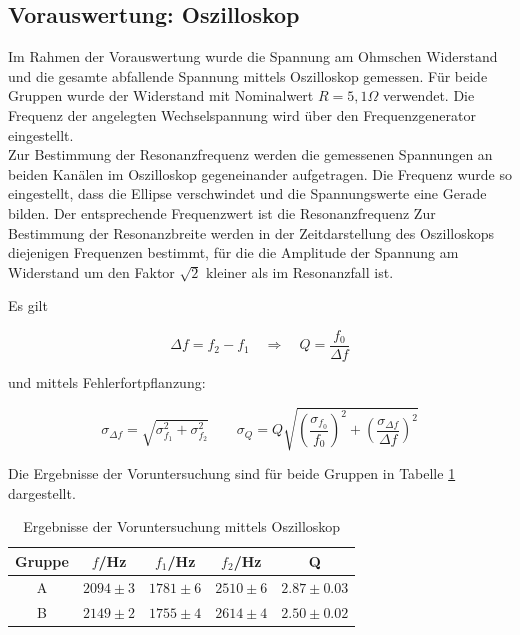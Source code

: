 \documentclass[12pt,a4paper]{article}
\begin{document}
\subsection{Vorauswertung: Oszilloskop}
Im Rahmen der Vorauswertung wurde die Spannung am Ohmschen Widerstand und die gesamte abfallende Spannung mittels Oszilloskop gemessen. Für beide Gruppen wurde der Widerstand mit Nominalwert $R = 5,1 \Omega$ verwendet. Die Frequenz der angelegten Wechselspannung wird über den Frequenzgenerator eingestellt.\\

Zur Bestimmung der Resonanzfrequenz werden die gemessenen Spannungen an beiden Kanälen im Oszilloskop gegeneinander aufgetragen. Die Frequenz wurde so eingestellt, dass die Ellipse verschwindet und die Spannungswerte eine Gerade bilden. Der entsprechende Frequenzwert ist die Resonanzfrequenz
Zur Bestimmung der Resonanzbreite werden in der Zeitdarstellung des Oszilloskops diejenigen Frequenzen bestimmt, für die die Amplitude der Spannung am Widerstand um den Faktor $\sqrt{2}$ kleiner als im Resonanzfall ist. 

Es gilt

\begin{equation}
\Delta f = f_2 - f_1 \quad \Rightarrow \quad Q = \frac{f_0}{\Delta f}
\end{equation}

und mittels Fehlerfortpflanzung:

\begin{equation}
\sigma_{\Delta f} = \sqrt{\sigma_{f_1}^2+\sigma_{f_2}^2} \qquad \sigma_Q = Q \sqrt{\left(\frac{\sigma_{f_0}}{f_0}\right)^2 + \left(\frac{\sigma_{\Delta f}}{\Delta f}\right)^2}
\end{equation}

Die Ergebnisse der Voruntersuchung sind für beide Gruppen in Tabelle \ref{tab:Voruntersuchung} dargestellt.

\begin{table}
\centering
\begin{tabular}{|c|c|c|c|c|}
\hline
Gruppe & $f$/Hz & $f_1$/Hz & $f_2$/Hz & Q\\
\hline
A & $2094 \pm 3$ & $1781 \pm 6$ & $2510 \pm 6$ & $2.87 \pm 0.03$ \\
\hline
B & $2149 \pm 2$ & $1755 \pm 4$ & $2614 \pm 4$ & $2.50 \pm 0.02$\\
\hline
\end{tabular}
\caption{Ergebnisse der Voruntersuchung mittels Oszilloskop}
\label{tab:Voruntersuchung}
\end{table}
\end{document}
